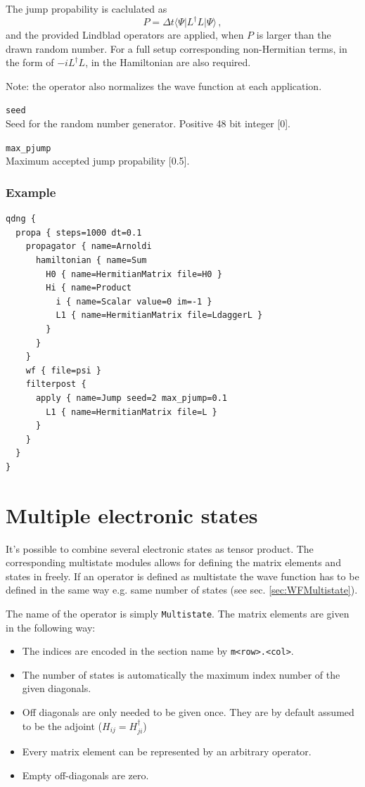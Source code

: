 \documentclass[a4paper,12pt]{scrbook}
\newcommand{\option}[2]{\item \texttt{#1}\\ #2}
\begin{document}
The jump propability is caclulated as
\begin{equation}
  P = \Delta t \langle \Psi \vert L^\dagger L \vert \Psi \rangle\,,
\end{equation}
and the provided Lindblad operators are applied, when $P$ is larger
than the drawn random number. For a full setup corresponding
non-Hermitian terms, in the form of $-iL^\dagger L$, in the Hamiltonian are also required.

Note: the operator also normalizes the wave function at each application.

\begin{options}
\option{seed}{Seed for the random number generator. Positive 48 bit integer [0].}
\option{max\_pjump}{Maximum accepted jump propability [0.5].}
\end{options}

\subsubsection*{Example}
\begin{verbatim}
qdng {
  propa { steps=1000 dt=0.1
    propagator { name=Arnoldi
      hamiltonian { name=Sum
        H0 { name=HermitianMatrix file=H0 }
        Hi { name=Product
          i { name=Scalar value=0 im=-1 }
          L1 { name=HermitianMatrix file=LdaggerL }
        }
      }
    }
    wf { file=psi }
    filterpost {
      apply { name=Jump seed=2 max_pjump=0.1
        L1 { name=HermitianMatrix file=L }
      }
    }
  }
}
\end{verbatim}


\section{Multiple electronic states}
It's possible to combine several electronic states as tensor product. The corresponding multistate
modules allows for defining the matrix elements and states in freely.
If an operator is defined as multistate the wave function has to be defined in the same way e.g. same
number of states (see sec. \ref{sec:WFMultistate}).

The name of the operator is simply \verb|Multistate|. The matrix elements are given in the following way:
\begin{itemize}
 \item The indices are encoded in the section name by \verb|m<row>.<col>|.
 \item The number of states is automatically the maximum index number of the given diagonals.
 \item Off diagonals are only needed to be given once. They are by default assumed to be the adjoint ($H_{ij} = H_{ji}^\dagger$)
 \item Every matrix element can be represented by an arbitrary operator.
 \item Empty off-diagonals are zero.
\end{itemize}
\end{document}
